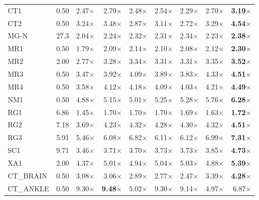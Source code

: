 \documentclass[journal]{IEEEtran}
\begin{document}
\begin{table}[t]
\begin{tabular}{lrrrrrrrr}
CT1            & 0.50 & 2.47$\times$ & 2.79$\times$ & 2.48$\times$ & 2.54$\times$ & 2.29$\times$ & 2.70$\times$ & \textbf{3.19$\times$} \\
CT2            & 0.50 & 3.24$\times$ & 3.48$\times$ & 2.87$\times$ & 3.11$\times$ & 2.72$\times$ & 3.29$\times$ & \textbf{4.54$\times$} \\
MG-N           & 27.3 & 2.04$\times$ & 2.24$\times$ & 2.32$\times$ & 2.31$\times$ & 2.34$\times$ & 2.23$\times$ & \textbf{2.38$\times$} \\
MR1            & 0.50 & 1.79$\times$ & 2.09$\times$ & 2.14$\times$ & 2.10$\times$ & 2.08$\times$ & 2.12$\times$ & \textbf{2.30$\times$} \\
MR2            & 2.00 & 2.77$\times$ & 3.28$\times$ & 3.34$\times$ & 3.31$\times$ & 3.31$\times$ & 3.35$\times$ & \textbf{3.52$\times$} \\
MR3            & 0.50 & 3.47$\times$ & 3.92$\times$ & 4.09$\times$ & 3.89$\times$ & 3.83$\times$ & 4.33$\times$ & \textbf{4.51$\times$} \\
MR4            & 0.50 & 3.58$\times$ & 4.12$\times$ & 4.18$\times$ & 4.09$\times$ & 4.03$\times$ & 4.21$\times$ & \textbf{4.49$\times$} \\
NM1            & 0.50 & 4.88$\times$ & 5.15$\times$ & 5.01$\times$ & 5.25$\times$ & 5.28$\times$ & 5.76$\times$ & \textbf{6.28$\times$} \\
RG1            & 6.86 & 1.45$\times$ & 1.70$\times$ & 1.70$\times$ & 1.70$\times$ & 1.69$\times$ & 1.63$\times$ & \textbf{1.72$\times$} \\
RG2            & 7.18 & 3.69$\times$ & 4.23$\times$ & 4.32$\times$ & 4.28$\times$ & 4.30$\times$ & 4.32$\times$ & \textbf{4.51$\times$} \\
RG3            & 5.91 & 5.46$\times$ & 6.08$\times$ & 6.82$\times$ & 6.11$\times$ & 6.12$\times$ & 6.99$\times$ & \textbf{7.31$\times$} \\
SC1            & 9.71 & 3.46$\times$ & 3.71$\times$ & 3.70$\times$ & 3.73$\times$ & 3.73$\times$ & 3.85$\times$ & \textbf{4.73$\times$} \\
XA1            & 2.00 & 4.37$\times$ & 5.01$\times$ & 4.94$\times$ & 5.04$\times$ & 5.03$\times$ & 4.88$\times$ & \textbf{5.39$\times$} \\
CT\_BRAIN      & 0.50 & 3.08$\times$ & 3.06$\times$ & 2.89$\times$ & 2.77$\times$ & 2.47$\times$ & 3.39$\times$ & \textbf{4.28$\times$} \\
CT\_ANKLE      & 0.50 & 9.30$\times$ & \textbf{9.48$\times$} & 5.02$\times$ & 9.30$\times$ & 9.14$\times$ & 4.97$\times$ & 6.87$\times$ \\

\end{tabular}
\end{table}
\end{document}
